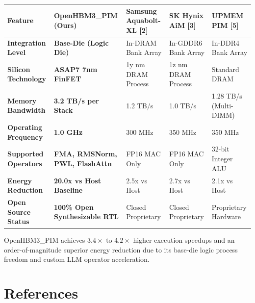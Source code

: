 \documentclass[journal,10pt,twocolumn]{IEEEtran}
\begin{document}
\begin{table}[htbp]
\centering\footnotesize
\begin{tabular}{p{} p{} p{} p{} p{}}
\toprule
\textbf{Feature} & \textbf{OpenHBM3\_PIM (Ours)} & \textbf{Samsung Aquabolt-XL [2]} & \textbf{SK Hynix AiM [3]} & \textbf{UPMEM PIM [5]} \\
\midrule
\textbf{Integration Level} & \textbf{Base-Die (Logic Die)} & In-DRAM Bank Array & In-GDDR6 Bank Array & In-DDR4 Bank Array \\
\textbf{Silicon Technology} & \textbf{ASAP7 7nm FinFET} & 1y nm DRAM Process & 1z nm DRAM Process & Standard DRAM \\
\textbf{Memory Bandwidth} & \textbf{3.2 TB/s per Stack} & 1.2 TB/s & 1.0 TB/s & 1.28 TB/s (Multi-DIMM) \\
\textbf{Operating Frequency} & \textbf{1.0 GHz} & 300 MHz & 350 MHz & 350 MHz \\
\textbf{Supported Operators} & \textbf{FMA, RMSNorm, PWL, FlashAttn} & FP16 MAC Only & FP16 MAC Only & 32-bit Integer ALU \\
\textbf{Energy Reduction} & \textbf{20.0x vs Host Baseline} & 2.5x vs Host & 2.7x vs Host & 2.1x vs Host \\
\textbf{Open Source Status} & \textbf{100\% Open Synthesizable RTL} & Closed Proprietary & Closed Proprietary & Proprietary Hardware \\
\bottomrule
\end{tabular}
\vspace{4pt}
\end{table}

OpenHBM3\_PIM achieves $3.4\times$ to $4.2\times$ higher execution speedups and an order-of-magnitude superior energy reduction due to its base-die logic process freedom and custom LLM operator acceleration.


\section{References}
\end{document}
